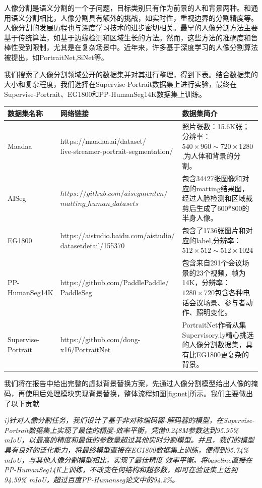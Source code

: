 \documentclass[11pt]{article}
\begin{document}
	人像分割是语义分割的一个子问题，目标类别只有作为前景的人和背景两种。和通用语义分割相比，人像分割具有额外的挑战，如实时性，重视边界的分割精度等。人像分割的发展历程也与深度学习技术的进步密切相关。最早的人像分割方法主要基于传统算法，如基于边缘检测和区域生长的方法。然而，这些方法的准确度和鲁棒性受到限制，尤其是在复杂场景中。近年来，许多基于深度学习的人像分割算法被提出，如PortraitNet\cite{porn},SiNet\cite{ref43}等。
	
	我们搜索了人像分割领域公开的数据集并对其进行整理，得到下表。结合数据集的大小和复杂程度，我们选择在Supervise-Portrait数据集上进行实验，最终在Supervise-Portrait、EG1800和PP-HumanSeg14K数据集上训练。
	\begin{center}
		\begin{tabular}{p{1.5cm}p{7cm}p{4cm}}
			\hline
			数据集名称&网络链接&数据集简介 \\ \hline
			Maadaa&\makecell{https://maadaa.ai/dataset/\\live-streamer-portrait-segmentation/}&照片张数：15.6K张；分辨率：$540\times960 \sim 720\times1280$,为人体和背景的分割。\\ \hline
			AISeg&\makecell{$https://github.com/aisegmentcn/$\\$matting\_human\_datasets$}&包含34427张图像和对应的matting结果图，经过人脸检测和区域裁剪后生成了600*800的半身人像。\\ \hline
			EG1800&\makecell{https://aistudio.baidu.com/aistudio/\\datasetdetail/155370}&包含了1736张图片和对应的label,分辨率：$512\times512 \sim 512\times1024$ \\ \hline
			PP-HumanSeg14K&\makecell{https://github.com/PaddlePaddle/\\PaddleSeg}&包含来自291个会议场景的23个视频，帧为14K，分辨率：$1280\times720$包含各种电话会议场景、参与者动作、照明变化。\\ \hline
			Supervise-Portrait&https://github.com/dong-x16/PortraitNet&PortraitNet作者从集Supervisory.ly精心挑选的人像分割数据集，具有比EG1800更复杂的背景。\\\hline
		\end{tabular}
	\end{center}

	我们将在报告中给出完整的虚拟背景替换方案，先通过人像分割模型给出人像的掩码，再使用后处理模块实现背景替换，整体流程如图\ref{fig:net}所示。我们主要做出了以下贡献

\textit{i)针对人像分割任务，我们设计了基于非对称编码器-解码器的模型，在Supervise-Portrait数据集上实现了最佳的精度-效率平衡，凭借0.248M参数达到95.95\% mIoU，以最高的精度和最低的参数量超过其他实时分割模型。并且，我们的模型具有良好的泛化能力，将最终模型直接在EG1800数据集上训练，便得到95.74\% mIoU，与其他人像分割模型相比，实现了最佳精度-效率平衡。将baseline直接在PP-HumanSeg14K上训练，不改变任何结构和超参数，即可在验证集上达到94.59\% mIoU，超过百度PP-Humanseg论文中的94.2\%。}
\end{document}
